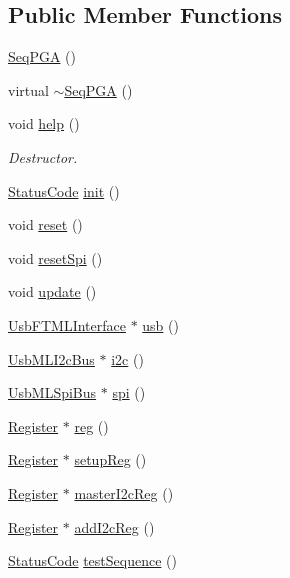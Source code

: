 \subsection*{Public Member Functions}
\begin{DoxyCompactItemize}
\item 
\hyperlink{classSeqPGA_a032240de5048a496dcce57ac28e10f65}{SeqPGA} ()
\item 
virtual \hyperlink{classSeqPGA_ac36a18cf2f56796a78fb91a1afc5cc1b}{$\sim$SeqPGA} ()
\item 
void \hyperlink{classSeqPGA_ae651bb2d5ac33e863951499c638655fe}{help} ()
\begin{DoxyCompactList}\small\item\em Destructor. \item\end{DoxyCompactList}\item 
\hyperlink{classStatusCode}{StatusCode} \hyperlink{classSeqPGA_aba1ead90de9e6f14042d8838db5ebe5b}{init} ()
\item 
void \hyperlink{classSeqPGA_aaadcbdd7ad7c96d2d69549b820da6809}{reset} ()
\item 
void \hyperlink{classSeqPGA_a52f122a1767691eb950a4aae5981edfc}{resetSpi} ()
\item 
void \hyperlink{classSeqPGA_a0003d286a27a82024d84b392edab2c3b}{update} ()
\item 
\hyperlink{classUsbFTMLInterface}{UsbFTMLInterface} $\ast$ \hyperlink{classSeqPGA_a10c68ea9de38eb0445d47e4b21b580a1}{usb} ()
\item 
\hyperlink{classUsbMLI2cBus}{UsbMLI2cBus} $\ast$ \hyperlink{classSeqPGA_ad1629388bbd38b013110ee03a1eea339}{i2c} ()
\item 
\hyperlink{classUsbMLSpiBus}{UsbMLSpiBus} $\ast$ \hyperlink{classSeqPGA_a9c6993bb241b4cc474d525f65696099a}{spi} ()
\item 
\hyperlink{classRegister}{Register} $\ast$ \hyperlink{classSeqPGA_a43c48f29313ca63046cc8efc6cc73e23}{reg} ()
\item 
\hyperlink{classRegister}{Register} $\ast$ \hyperlink{classSeqPGA_a83598ab914c8e3ee5afa34c5e6e7fdf4}{setupReg} ()
\item 
\hyperlink{classRegister}{Register} $\ast$ \hyperlink{classSeqPGA_a3906fe0cdfd9042a67c0fa35ae75147a}{masterI2cReg} ()
\item 
\hyperlink{classRegister}{Register} $\ast$ \hyperlink{classSeqPGA_a80eec67d433c12f8fcdf1ad73c6b8f59}{addI2cReg} ()
\item 
\hyperlink{classStatusCode}{StatusCode} \hyperlink{classSeqPGA_a299f2826e5edba5636f0f41233683156}{testSequence} ()

\end{DoxyCompactItemize}
